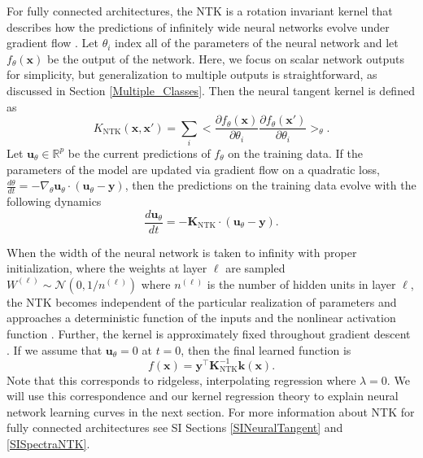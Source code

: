 \documentclass{article}
\begin{document}
For fully connected architectures, the NTK is a rotation invariant kernel that describes how the predictions of infinitely wide neural networks evolve under gradient flow \cite{jacot2018neural}. Let $\theta_i$ index all of the parameters of the neural network and let $f_\theta(\mathbf{x})$ be the output of the network. Here, we focus on scalar network outputs for simplicity, but generalization to multiple outputs is straightforward, as discussed in Section \ref{Multiple_Classes}. Then the neural tangent kernel is defined as 
\begin{equation}
    K_{\text{NTK}}(\mathbf{x},\mathbf{x}') = \sum_{i} \Big< \frac{\partial f_\theta(\mathbf{x})}{\partial \theta_i} \frac{\partial f_\theta(\mathbf{x}')}{\partial \theta_i} \Big>_{\theta}.
\end{equation}
%
Let $\mathbf{u}_\theta \in \mathbb{R}^{p}$ be the current predictions of $f_\theta$ on the training data. If the parameters of the model are updated via gradient flow on a quadratic loss, $\frac{d \theta}{dt} = - \nabla_\theta \mathbf{u}_\theta \cdot (\mathbf{u}_\theta - \mathbf{y}) $, then the predictions on the training data evolve with the following dynamics \cite{pehlevan2018flexibility,jacot2018neural,arora2019exact,lee2019wide}
\begin{equation}
\frac{d\mathbf{u}_\theta}{dt}  = -\mathbf{K}_{\text{NTK}} \cdot  \left(\mathbf{u}_\theta - \mathbf{y}\right).
\end{equation}
%

When the width of the neural network is taken to infinity with proper initialization, where the weights at layer $\ell$ are sampled $W^{(\ell)} \sim \mathcal{N}\left(0,1/ n^{(\ell)}\right)$ where $n^{(\ell)}$ is the number of hidden units in layer $\ell$, the NTK becomes independent of the particular realization of parameters and approaches a deterministic function of the inputs and the nonlinear activation function \cite{jacot2018neural}. Further, the kernel is approximately fixed throughout gradient descent \cite{jacot2018neural,arora2019exact}. If we assume that $\mathbf{u}_\theta = 0 $ at $t=0$, then the final learned function is
\begin{equation}
    f(\mathbf{x}) = \mathbf{y}^\top \mathbf{K}_{\text{NTK}}^{-1} \mathbf{k}(\mathbf{x}).
\end{equation}
%
Note that this corresponds to ridgeless, interpolating regression where $\lambda = 0$. We will use this correspondence and our kernel regression theory to explain neural network learning curves in the next section. For more information about NTK for fully connected architectures see SI Sections \ref{SINeuralTangent} and \ref{SISpectraNTK}.
\end{document}
